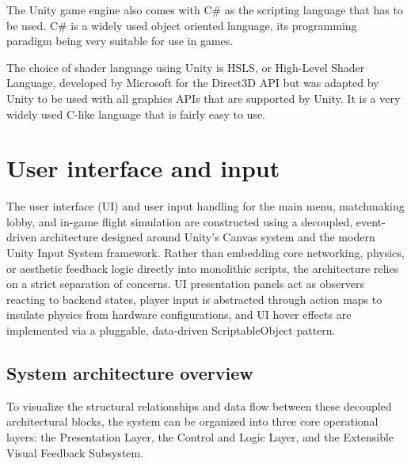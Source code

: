 \documentclass[12pt]{report}
\begin{document}
The Unity game engine also comes with C\# as the scripting language that has to be used. C\# is a widely used object oriented language, its programming paradigm being very suitable for use in games. 

The choice of shader language using Unity is HSLS, or High-Level Shader Language, developed by Microsoft for the Direct3D API but was adapted by Unity to be used with all graphics APIs that are supported by Unity. It is a very widely used C-like language that is fairly easy to use.

\section{User interface and input}

The user interface (UI) and user input handling for the main menu, matchmaking lobby, and in-game flight simulation are constructed using a decoupled, event-driven architecture designed around Unity's Canvas system and the modern Unity Input System framework. Rather than embedding core networking, physics, or aesthetic feedback logic directly into monolithic scripts, the architecture relies on a strict separation of concerns. UI presentation panels act as observers reacting to backend states, player input is abstracted through action maps to insulate physics from hardware configurations, and UI hover effects are implemented via a pluggable, data-driven ScriptableObject pattern.

\subsection{System architecture overview}

To visualize the structural relationships and data flow between these decoupled architectural blocks, the system can be organized into three core operational layers: the Presentation Layer, the Control and Logic Layer, and the Extensible Visual Feedback Subsystem.
\end{document}
